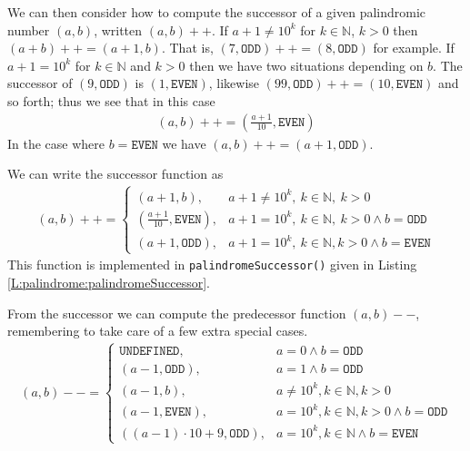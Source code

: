 \documentclass[oneside,12pt]{book}   	%
\newcounter{ex}
\newcounter{pr}
\theoremstyle{definition}
\newcommand{\Land}[0]{\wedge}
\begin{document}
\begin{spacing}{1.618}
				We can then consider how to compute the successor of a given palindromic number $(a, b)$, written $(a, b)++$. If $a+1\neq 10^k$ for $k\in \mathbb{N}$, $k>0$ then $(a+b)++=(a+1, b)$. That is, $(7, \mathtt{ODD})++=(8, \mathtt{ODD})$ for example. If $a+1=10^k$ for $k\in\mathbb{N}$ and $k>0$ then we have two situations depending on $b$. The successor of $(9, \mathtt{ODD})$ is $(1, \mathtt{EVEN})$, likewise $(99, \mathtt{ODD})++=(10, \mathtt{EVEN})$ and so forth; thus we see that in this case 
				\begin{alignat*}{4}
					(a, b)++=\left(\frac{a+1}{10}, \mathtt{EVEN}\right)
				\end{alignat*}
				In the case where $b=\mathtt{EVEN}$ we have $(a, b)++=(a+1, \mathtt{ODD})$. 
			
				We can write the successor function as 
				\begin{alignat}{4}
					(a, b)++=\left\{\begin{array}{ll}
						(a+1, b),&a+1\neq 10^k,~k\in\mathbb{N},~k>0 \\
						\left(\frac{a+1}{10}, \mathtt{EVEN}\right),&a+1=10^k,~k\in\mathbb{N},~k>0\Land b=\mathtt{ODD} \\
						\left(a+1, \mathtt{ODD}\right),&a+1=10^k,~k\in\mathbb{N},k>0\Land b=\mathtt{EVEN}
					\end{array}\right.
				\end{alignat}
				This function is implemented in \texttt{palindromeSuccessor()} given in Listing \ref{L:palindrome:palindromeSuccessor}. 
				
				
				From the successor we can compute the predecessor function $(a,b)--$, remembering to take care of a  few extra special cases. 
				\begin{alignat}{4}
					(a,b)--=\left\{\begin{array}{ll}
						\mathtt{UNDEFINED},&a=0\Land b=\mathtt{ODD} \\
						\left(a-1, \mathtt{ODD}\right),&a=1\Land b=\mathtt{ODD} \\
						(a-1, b),&a\neq 10^k,k\in\mathbb{N},k>0 \\
						\left(a-1, \mathtt{EVEN}\right),&a=10^k,k\in\mathbb{N},k>0\Land b=\mathtt{ODD} \\
						\left(\left(a-1\right)\cdot 10+9, \mathtt{ODD}\right),&a=10^k,k\in\mathbb{N}\Land b=\mathtt{EVEN}
					\end{array}\right.
				\end{alignat}


\end{spacing}
\end{document}
